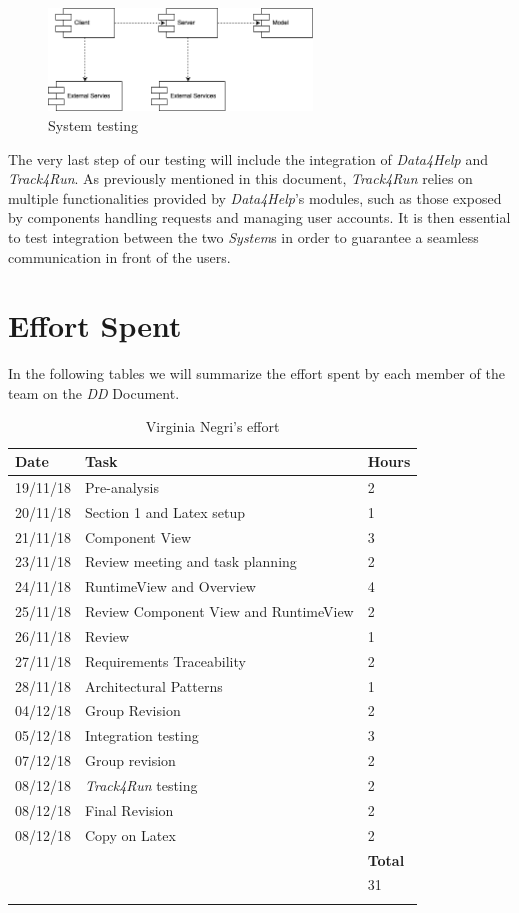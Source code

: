 \documentclass[titlepage]{article}
\begin{document}
\begin{figure}[H]
	\center
  	\includegraphics[width=7cm]{SystemTesting.png}
  	\caption{System testing}
 	\label{fig:SystemTesting}
\end{figure}
\noindent
The very last step of our testing will include the integration of {\it Data4Help} and {\it Track4Run}. As previously mentioned in this document, {\it Track4Run} relies on multiple functionalities provided by {\it Data4Help}’s modules, such as those exposed by components handling requests and managing user accounts. It is then essential to test integration between the two {\it System}s in order to guarantee a seamless communication in front of the users.  
\pagebreak


\section{Effort Spent}

In the following tables we will summarize the effort spent by each member of the team on the {\it DD} Document.
		
		
	\begin{longtable}{| p{2 cm} | p{5 cm} | p{2 cm} |} 
			\hline
			{\bf Date} & {\bf Task} & {\bf Hours}\\
			\hline
			19/11/18 & Pre-analysis & 2 \\
			20/11/18 & Section 1 and Latex setup & 1\\
			21/11/18 & Component View & 3 \\
			23/11/18 & Review meeting and task planning & 2 \\
			24/11/18 & RuntimeView and Overview & 4 \\
			25/11/18 & Review Component View and RuntimeView & 2 \\
			26/11/18 & Review & 1 \\
			27/11/18 & Requirements Traceability & 2 \\
			28/11/18 & Architectural Patterns & 1 \\
			04/12/18 & Group Revision & 2\\
			05/12/18 & Integration testing & 3 \\
			07/12/18 & Group revision & 2 \\
			08/12/18 & {\it Track4Run} testing & 2 \\
			08/12/18 & Final Revision & 2 \\
			08/12/18 & Copy on Latex & 2 \\
			\hline
			& & {\bf Total} \\
			\hline
			& & 31 \\
			\hline
			\caption{Virginia Negri's effort}
		\end{longtable}
	
\end{document}
